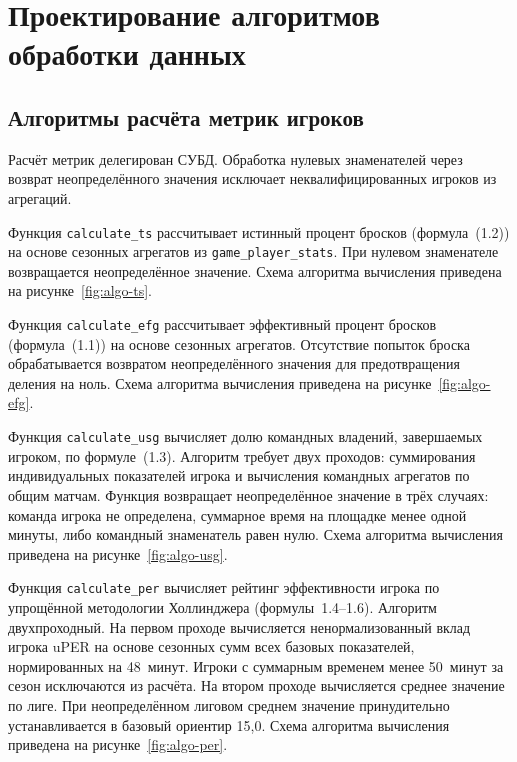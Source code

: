 \section{Проектирование алгоритмов обработки данных}\label{sec:algorithms-design}

\subsection{Алгоритмы расчёта метрик игроков}\label{subsec:metric-algorithms}

Расчёт метрик делегирован СУБД. Обработка нулевых знаменателей через
возврат неопределённого значения исключает неквалифицированных игроков
из агрегаций.

Функция \texttt{calculate\_ts} рассчитывает истинный процент бросков
(формула~(1.2)) на основе сезонных агрегатов из \texttt{game\_player\_stats}.
При нулевом знаменателе возвращается неопределённое значение.
Схема алгоритма вычисления приведена на рисунке~\ref{fig:algo-ts}.
\flowchartCalculateTs

Функция \texttt{calculate\_efg} рассчитывает эффективный процент бросков
(формула~(1.1)) на основе сезонных агрегатов. Отсутствие попыток броска
обрабатывается возвратом неопределённого значения для предотвращения
деления на ноль.
Схема алгоритма вычисления приведена на рисунке~\ref{fig:algo-efg}.
\flowchartCalculateEfg

Функция \texttt{calculate\_usg} вычисляет долю командных владений,
завершаемых игроком, по формуле~(1.3). Алгоритм требует двух проходов:
суммирования индивидуальных показателей игрока и вычисления командных
агрегатов по общим матчам. Функция возвращает неопределённое значение в трёх случаях: команда игрока не
определена, суммарное время на площадке менее одной минуты, либо командный
знаменатель равен нулю.
Схема алгоритма вычисления приведена на рисунке~\ref{fig:algo-usg}.
\flowchartCalculateUsg

Функция \texttt{calculate\_per} вычисляет рейтинг эффективности игрока
по упрощённой методологии Холлинджера (формулы~1.4--1.6). Алгоритм
двухпроходный. На первом проходе вычисляется ненормализованный вклад игрока
uPER на основе сезонных сумм всех базовых показателей, нормированных на
48~минут. Игроки с суммарным временем менее 50~минут за сезон исключаются
из расчёта. На втором проходе вычисляется среднее значение по лиге.
При неопределённом лиговом среднем значение принудительно устанавливается
в базовый ориентир 15,0.
Схема алгоритма вычисления приведена на рисунке~\ref{fig:algo-per}.
\flowchartCalculatePer

